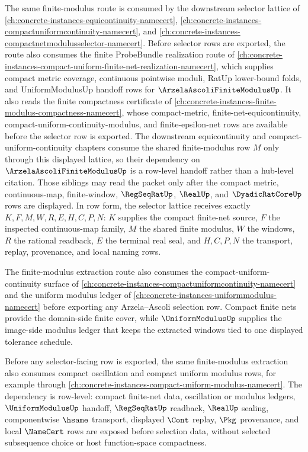 The same finite-modulus route is consumed by the downstream selector lattice of \autoref{ch:concrete-instances-equicontinuity-namecert}, \autoref{ch:concrete-instances-compactuniformcontinuity-namecert}, and \autoref{ch:concrete-instances-compactnetmodulusselector-namecert}. Before selector rows are exported, the route also consumes the finite ProbeBundle realization route of \autoref{ch:concrete-instances-compact-uniform-finite-net-realization-namecert}, which supplies compact metric coverage, continuous pointwise moduli, RatUp lower-bound folds, and UniformModulusUp handoff rows for $\ArzelaAscoliFiniteModulusUp$. It also reads the finite compactness certificate of \autoref{ch:concrete-instances-finite-modulus-compactness-namecert}, whose compact-metric, finite-net-equicontinuity, compact-uniform-continuity-modulus, and finite-epsilon-net rows are available before the selector row is exported. The downstream equicontinuity and compact-uniform-continuity chapters consume the shared finite-modulus row $M$ only through this displayed lattice, so their dependency on $\ArzelaAscoliFiniteModulusUp$ is a row-level handoff rather than a hub-level citation. Those siblings may read the packet only after the compact metric, continuous-map, finite-window, $\RegSeqRatUp$, $\RealUp$, and $\DyadicRatCoreUp$ rows are displayed. In row form, the selector lattice receives exactly $K,F,M,W,R,E,H,C,P,N$: $K$ supplies the compact finite-net source, $F$ the inspected continuous-map family, $M$ the shared finite modulus, $W$ the windows, $R$ the rational readback, $E$ the terminal real seal, and $H,C,P,N$ the transport, replay, provenance, and local naming rows.

The finite-modulus extraction route also consumes the compact-uniform-continuity surface of \autoref{ch:concrete-instances-compactuniformcontinuity-namecert} and the uniform modulus ledger of \autoref{ch:concrete-instances-uniformmodulus-namecert} before exporting any Arzela--Ascoli selection row. Compact finite nets provide the domain-side finite cover, while $\UniformModulusUp$ supplies the image-side modulus ledger that keeps the extracted windows tied to one displayed tolerance schedule.

Before any selector-facing row is exported, the same finite-modulus extraction also consumes compact oscillation and compact uniform modulus rows, for example through \autoref{ch:concrete-instances-compact-uniform-modulus-namecert}. The dependency is row-level: compact finite-net data, oscillation or modulus ledgers, $\UniformModulusUp$ handoff, $\RegSeqRatUp$ readback, $\RealUp$ sealing, componentwise $\hsame$ transport, displayed $\Cont$ replay, $\Pkg$ provenance, and local $\NameCert$ rows are exposed before selection data, without selected subsequence choice or host function-space compactness.

